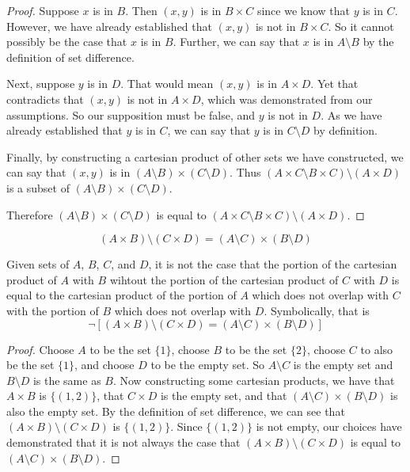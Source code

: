 \documentclass[main.tex]{subfiles}
\begin{document}
\begin{proof}
	Suppose \(x\) is in \(B\). Then \((x,y)\) is in \(B \times C\) since we
	know that \(y\) is in \(C\). However, we have already established that
	\((x,y)\) is not in \(B \times C\). So it cannot possibly be the case
	that \(x\) is in \(B\). Further, we can say that \(x\) is in
	\(A \setminus B\) by the definition of set difference.

	Next, suppose \(y\) is in \(D\). That would mean \((x,y)\) is in
	\(A \times D\). Yet that contradicts that \((x,y)\) is not in
	\(A \times D\), which was demonstrated from our assumptions. So our
	supposition must be false, and \(y\) is not in \(D\). As we have already
	established that \(y\) is in \(C\), we can say that \(y\) is in
	\(C \setminus D\) by definition.

	Finally, by constructing a cartesian product of other sets we have
	constructed, we can say that \((x,y)\) is in
	\((A \setminus B) \times (C \setminus D)\). Thus
	\((A \times C \setminus B \times C) \setminus (A \times D)\) is a subset
	of \((A \setminus B) \times (C \setminus D)\).

	\medskip
	Therefore \((A \setminus B) \times (C \setminus D)\) is equal to
	\((A \times C \setminus B \times C) \setminus (A \times D)\).
\end{proof}

\subproblem{}\label{2q}
\[(A \times B) \setminus (C \times D) = (A \setminus C) \times (B \setminus D)\]
\begin{thm}
	Given sets of \(A\), \(B\), \(C\), and \(D\), it is not the case that
	the portion of the cartesian product of \(A\) with \(B\) wihtout the
	portion of the cartesian product of \(C\) with \(D\) is equal to the
	cartesian product of the portion of \(A\) which does not overlap with
	\(C\) with the portion of \(B\) which does not overlap with \(D\).
	Symbolically, that is
	\[\neg [(A \times B) \setminus (C \times D) = (A \setminus C) \times (B \setminus D)]\]
\end{thm}
\begin{proof}
	Choose \(A\) to be the set \(\{1\}\), choose \(B\) to be the set
	\(\{2\}\), choose \(C\) to also be the set \(\{1\}\), and choose \(D\)
	to be the empty set. So \(A \setminus C\) is the empty set and
	\(B \setminus D\) is the same as \(B\). Now constructing some cartesian
	products, we have that \(A \times B\) is \(\{(1,2)\}\), that
	\(C \times D\) is the empty set, and that
	\((A \setminus C) \times (B \setminus D)\) is also the empty set. By the
	definition of set difference, we can see that
	\((A \times B) \setminus (C \times D)\) is \(\{(1,2)\}\). Since
	\(\{(1,2)\}\) is not empty, our choices have demonstrated that it is not
	always the case that \((A \times B) \setminus (C \times D)\) is equal to
	\((A \setminus C) \times (B \setminus D)\).
\end{proof}
\end{document}
